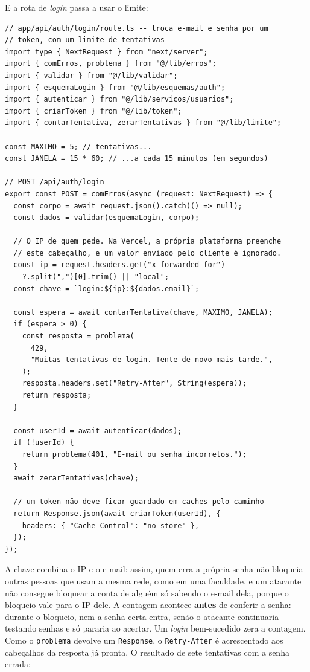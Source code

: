 E a rota de \textit{login} passa a usar o limite:

\begin{codigo}
\begin{Verbatim}[breaklines=true, breaksymbolleft={}, fontsize=\footnotesize]
// app/api/auth/login/route.ts -- troca e-mail e senha por um
// token, com um limite de tentativas
import type { NextRequest } from "next/server";
import { comErros, problema } from "@/lib/erros";
import { validar } from "@/lib/validar";
import { esquemaLogin } from "@/lib/esquemas/auth";
import { autenticar } from "@/lib/servicos/usuarios";
import { criarToken } from "@/lib/token";
import { contarTentativa, zerarTentativas } from "@/lib/limite";

const MAXIMO = 5; // tentativas...
const JANELA = 15 * 60; // ...a cada 15 minutos (em segundos)

// POST /api/auth/login
export const POST = comErros(async (request: NextRequest) => {
  const corpo = await request.json().catch(() => null);
  const dados = validar(esquemaLogin, corpo);

  // O IP de quem pede. Na Vercel, a própria plataforma preenche
  // este cabeçalho, e um valor enviado pelo cliente é ignorado.
  const ip = request.headers.get("x-forwarded-for")
    ?.split(",")[0].trim() || "local";
  const chave = `login:${ip}:${dados.email}`;

  const espera = await contarTentativa(chave, MAXIMO, JANELA);
  if (espera > 0) {
    const resposta = problema(
      429,
      "Muitas tentativas de login. Tente de novo mais tarde.",
    );
    resposta.headers.set("Retry-After", String(espera));
    return resposta;
  }

  const userId = await autenticar(dados);
  if (!userId) {
    return problema(401, "E-mail ou senha incorretos.");
  }
  await zerarTentativas(chave);

  // um token não deve ficar guardado em caches pelo caminho
  return Response.json(await criarToken(userId), {
    headers: { "Cache-Control": "no-store" },
  });
});
\end{Verbatim}
\end{codigo}

A chave combina o IP e o e-mail: assim, quem erra a própria senha não bloqueia outras pessoas que usam a mesma rede, como em uma faculdade, e um atacante não consegue bloquear a conta de alguém só sabendo o e-mail dela, porque o bloqueio vale para o IP dele. A contagem acontece \textbf{antes} de conferir a senha: durante o bloqueio, nem a senha certa entra, senão o atacante continuaria testando senhas e só pararia ao acertar. Um \textit{login} bem-sucedido zera a contagem. Como o \texttt{problema} devolve um \texttt{Response}, o \texttt{Retry-After} é acrescentado aos cabeçalhos da resposta já pronta. O resultado de sete tentativas com a senha errada:

